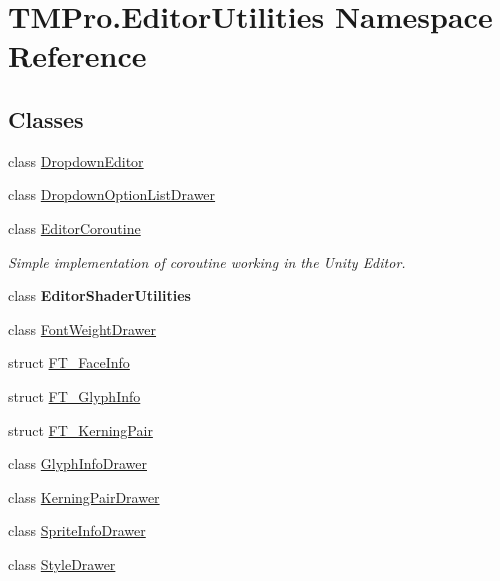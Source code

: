 \hypertarget{namespace_t_m_pro_1_1_editor_utilities}{}\section{T\+M\+Pro.\+Editor\+Utilities Namespace Reference}
\label{namespace_t_m_pro_1_1_editor_utilities}
\subsection*{Classes}
\begin{DoxyCompactItemize}
\item 
class \mbox{\hyperlink{class_t_m_pro_1_1_editor_utilities_1_1_dropdown_editor}{Dropdown\+Editor}}
\item 
class \mbox{\hyperlink{class_t_m_pro_1_1_editor_utilities_1_1_dropdown_option_list_drawer}{Dropdown\+Option\+List\+Drawer}}
\item 
class \mbox{\hyperlink{class_t_m_pro_1_1_editor_utilities_1_1_editor_coroutine}{Editor\+Coroutine}}
\begin{DoxyCompactList}\small\item\em Simple implementation of coroutine working in the Unity Editor. \end{DoxyCompactList}\item 
class {\bfseries Editor\+Shader\+Utilities}
\item 
class \mbox{\hyperlink{class_t_m_pro_1_1_editor_utilities_1_1_font_weight_drawer}{Font\+Weight\+Drawer}}
\item 
struct \mbox{\hyperlink{struct_t_m_pro_1_1_editor_utilities_1_1_f_t___face_info}{F\+T\+\_\+\+Face\+Info}}
\item 
struct \mbox{\hyperlink{struct_t_m_pro_1_1_editor_utilities_1_1_f_t___glyph_info}{F\+T\+\_\+\+Glyph\+Info}}
\item 
struct \mbox{\hyperlink{struct_t_m_pro_1_1_editor_utilities_1_1_f_t___kerning_pair}{F\+T\+\_\+\+Kerning\+Pair}}
\item 
class \mbox{\hyperlink{class_t_m_pro_1_1_editor_utilities_1_1_glyph_info_drawer}{Glyph\+Info\+Drawer}}
\item 
class \mbox{\hyperlink{class_t_m_pro_1_1_editor_utilities_1_1_kerning_pair_drawer}{Kerning\+Pair\+Drawer}}
\item 
class \mbox{\hyperlink{class_t_m_pro_1_1_editor_utilities_1_1_sprite_info_drawer}{Sprite\+Info\+Drawer}}
\item 
class \mbox{\hyperlink{class_t_m_pro_1_1_editor_utilities_1_1_style_drawer}{Style\+Drawer}}

\end{DoxyCompactItemize}
